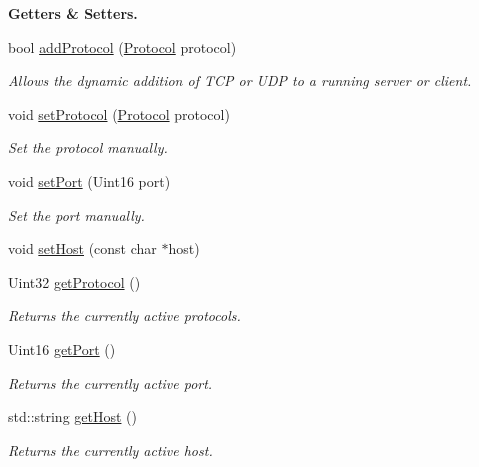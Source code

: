 \begin{Indent}{\bf Getters \& Setters.}\par
\begin{DoxyCompactItemize}
\item 
bool \hyperlink{classNetManager_a444e45de6f806c4c27d7f9915f898329}{add\-Protocol} (\hyperlink{NetManager_8h_a9af285d1232beed01f31aac5d3a5469f}{Protocol} protocol)
\begin{DoxyCompactList}\small\item\em Allows the dynamic addition of T\-C\-P or U\-D\-P to a running server or client. \end{DoxyCompactList}\item 
void \hyperlink{classNetManager_af370ee8343ff23121c0c2f180c34dabc}{set\-Protocol} (\hyperlink{NetManager_8h_a9af285d1232beed01f31aac5d3a5469f}{Protocol} protocol)
\begin{DoxyCompactList}\small\item\em Set the protocol manually. \end{DoxyCompactList}\item 
void \hyperlink{classNetManager_af5db4e28511390202b17f6d711f42d83}{set\-Port} (Uint16 port)
\begin{DoxyCompactList}\small\item\em Set the port manually. \end{DoxyCompactList}\item 
void \hyperlink{classNetManager_a47666370887fee3b2fa27ae7bff1065f}{set\-Host} (const char $\ast$host)
\item 
Uint32 \hyperlink{classNetManager_a3c941b21b356a166f2ebbdd522dc792d}{get\-Protocol} ()
\begin{DoxyCompactList}\small\item\em Returns the currently active protocols. \end{DoxyCompactList}\item 
Uint16 \hyperlink{classNetManager_aa6924b10800963247c025870b1116a62}{get\-Port} ()
\begin{DoxyCompactList}\small\item\em Returns the currently active port. \end{DoxyCompactList}\item 
std\-::string \hyperlink{classNetManager_abe7cce0db370157b36d4e16a903a0581}{get\-Host} ()
\begin{DoxyCompactList}\small\item\em Returns the currently active host. \end{DoxyCompactList}\end{DoxyCompactItemize}
\end{Indent}
